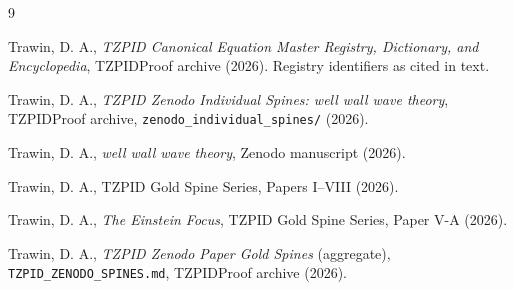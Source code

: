\documentclass[11pt]{article}
\theoremstyle{remark}
\begin{document}
\begin{thebibliography}{9}

 Trawin, D. A., \emph{TZPID Canonical Equation Master Registry, Dictionary, and Encyclopedia}, TZPIDProof archive (2026). Registry identifiers as cited in text.

 Trawin, D. A., \emph{TZPID Zenodo Individual Spines: well wall wave theory}, TZPIDProof archive, \texttt{zenodo\_individual\_spines/} (2026).

 Trawin, D. A., \emph{well wall wave theory}, Zenodo manuscript (2026).

 Trawin, D. A., TZPID Gold Spine Series, Papers I--VIII (2026).

 Trawin, D. A., \emph{The Einstein Focus}, TZPID Gold Spine Series, Paper V-A (2026).

 Trawin, D. A., \emph{TZPID Zenodo Paper Gold Spines} (aggregate), \texttt{TZPID\_ZENODO\_SPINES.md}, TZPIDProof archive (2026).

\end{thebibliography}
\end{document}
